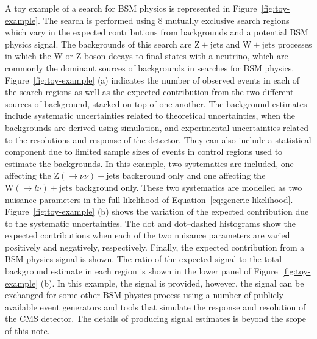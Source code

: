A toy example of a search for BSM physics is represented in Figure~\ref{fig:toy-example}. The search is performed using 8 mutually exclusive search regions 
which vary in the expected contributions from backgrounds and a potential BSM physics signal. The backgrounds of this search are $\mathrm{Z+jets}$ and $\mathrm{W+jets}$ processes in which the 
W or Z boson decays to final states with a neutrino, which are commonly the dominant sources of backgrounds in searches for BSM physics. Figure~\ref{fig:toy-example} (a) indicates the 
number of observed events in each of the search regions as well as the expected contribution from the two different sources of background, stacked on top of one another. 
The background estimates include systematic uncertainties related to theoretical uncertainties, when the backgrounds are derived using 
simulation, and experimental uncertainties related to the resolutions and response of the detector. They can also include a statistical component 
due to limited sample sizes of events in control regions used to estimate the backgrounds. In this example, two systematics are included, one affecting the $\mathrm{Z}(\rightarrow \nu\nu)+\mathrm{jets}$ background only
and one affecting the $\mathrm{W}(\rightarrow l\nu)+\mathrm{jets}$ background only. These two systematics are modelled as two nuisance parameters in the full likelihood of Equation~\ref{eq:generic-likelihood}. 
Figure~\ref{fig:toy-example} (b) shows the variation of the expected contribution due to the systematic uncertainties. 
The dot and dot--dashed histograms show the expected 
contributions when each of the two nuisance parameters are varied positively and negatively, respectively.
Finally, the expected contribution from a BSM physics signal is shown. 
The ratio of the expected signal to the total background estimate in each region is shown in the lower panel of Figure~\ref{fig:toy-example} (b). 
In this example, the signal is provided, however, the 
signal can be exchanged for some other BSM physics process using a number of publicly available event generators and tools that simulate the response 
and resolution of the CMS detector. The details of producing signal estimates is beyond the scope of this note. 

